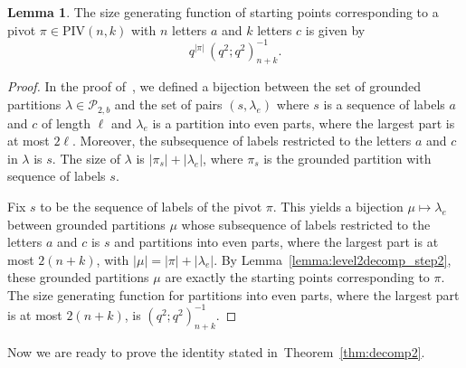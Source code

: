 \documentclass[11pt]{article}
\theoremstyle{definition}
\newtheorem{lemma}[theorem]{Lemma}
\theoremstyle{remark}
\theoremstyle{definition}
\numberwithin{equation}{section}
\begin{document}
\begin{lemma}\label{lemma:level2decomp_step4}
  The size generating function of starting points corresponding to a
  pivot \(\pi\in\mathrm{PIV}(n,k)\) with \(n\) letters \(a\) and \(k\)
  letters \(c\) is given by
  \[
    q^{|\pi|}\,(q^2;q^2)_{n+k}^{-1}.
  \]
\end{lemma}
\begin{proof}
  In the proof of~\cite[Theorem~1.11]{DJ25}, we defined a bijection between the set of grounded partitions \(\lambda\in\mathcal{P}_{2,b}\)
  and the set of pairs \((s,\lambda_e)\) where \(s\) is a sequence of
  labels \(a\) and \(c\) of length \(\ell\) and \(\lambda_e\) is a
  partition into even parts, where the largest part is at most
  \(2\ell\). Moreover, the subsequence of labels restricted to the
  letters \(a\) and \(c\) in \(\lambda\) is \(s\). The size of \(\lambda\) is \(|\pi_s|+|\lambda_e|\), where \(\pi_s\) is the grounded partition with sequence of labels \(s\).

  Fix \(s\) to be the sequence of labels of the pivot \(\pi\). This
  yields a bijection \(\mu\mapsto\lambda_e\) between grounded
  partitions \(\mu\) whose subsequence of labels restricted to the
  letters \(a\) and \(c\) is \(s\) and partitions into even
  parts, where the largest part is at most \(2(n+k)\), with \(|\mu|=|\pi|+|\lambda_e|\). By Lemma~\ref{lemma:level2decomp_step2}, these grounded partitions \(\mu\) are exactly the starting points corresponding to \(\pi\). The size generating function for
  partitions into even parts, where the largest part is at most \(2(n+k)\), is
  \((q^2;q^2)_{n+k}^{-1}\).
\end{proof}

Now we are ready to prove the identity stated in~Theorem~\ref{thm:decomp2}.
\end{document}
